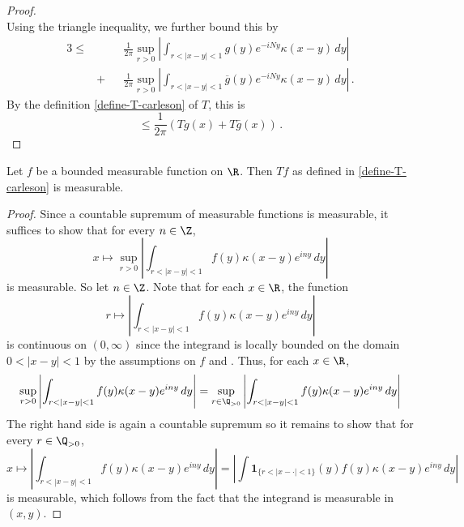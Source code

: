 \begin{proof}
\begin{equation*}
    \end{equation*}
    Using the triangle inequality, we further bound this by
    \begin{alignat*}{3}
        \le&&&\frac{1}{2\pi} \sup_{r > 0} \left| \int_{r < |x-y| < 1} g(y) e^{-iNy} \kappa(x-y) \, dy\right| \\
        &+ &&\frac{1}{2\pi} \sup_{r > 0} \left| \int_{r < |x-y| < 1} \overline{g}(y) e^{-iNy} \kappa(x-y) \, dy\right|\,.
    \end{alignat*}
    By the definition \eqref{define-T-carleson} of $T$, this is
    \begin{equation*}
        \le \frac{1}{2\pi} (Tg(x) + T\bar{g}(x))\,.
    \end{equation*}
\end{proof}

\begin{lemma}
    \label{real-Carleson-operator-measurable}
    \leanok
    Let $f$ be a bounded measurable function on $\R$. Then $Tf$ as defined in \eqref{define-T-carleson} is measurable.
\end{lemma}
\begin{proof}
    \leanok
    Since a countable supremum of measurable functions is measurable, it suffices to show that for every $n\in\Z$,
    \begin{equation*}
        x \mapsto \sup_{r>0}\left|\int_{r<|x-y|<1} f(y)\kappa(x-y) e^{iny}\, dy\right|
    \end{equation*}
    is measurable. So let $n\in\Z$.
    Note that for each $x\in\R$, the function
    \begin{equation*}
        r \mapsto \left|\int_{r<|x-y|<1} f(y)\kappa(x-y) e^{iny}\, dy\right|
    \end{equation*}
    is continuous on $(0,\infty)$ since the integrand is locally bounded on the domain $0<|x-y|<1$ by the assumptions on $f$ and .
    Thus, for each $x\in\R$,
    \begin{equation*}
        \sup_{r>0}\left|\int_{r<|x-y|<1} f(y)\kappa(x-y) e^{iny}\, dy\right|
        =\sup_{r\in\Q_{>0}}\left|\int_{r<|x-y|<1} f(y)\kappa(x-y) e^{iny}\, dy\right|
    \end{equation*}
    The right hand side is again a countable supremum so it remains to show that for every $r\in\Q_{>0}$,
    \begin{equation*}
        x \mapsto \left|\int_{r<|x-y|<1} f(y)\kappa(x-y) e^{iny}\, dy\right| = \left|\int \mathbf{1}_{\{r<|x-\cdot|<1\}}(y) f(y)\kappa(x-y) e^{iny}\, dy\right|
    \end{equation*}
    is measurable, which follows from the fact that the integrand is measurable in $(x,y)$.
\end{proof}

